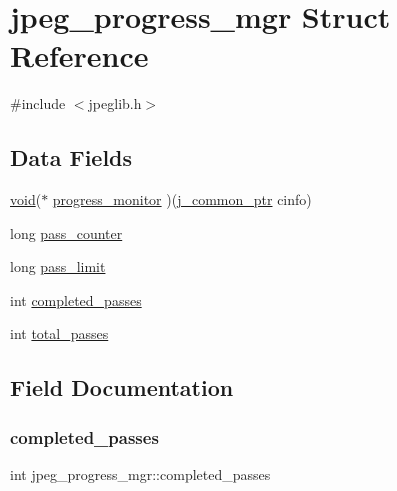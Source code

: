\hypertarget{structjpeg__progress__mgr}{}\section{jpeg\+\_\+progress\+\_\+mgr Struct Reference}
\label{structjpeg__progress__mgr}


{\ttfamily \#include $<$jpeglib.\+h$>$}

\subsection*{Data Fields}
\begin{DoxyCompactItemize}
\item 
\hyperlink{png_8h_ac9c84fa68bbad002983e35ce3663c686}{void}($\ast$ \hyperlink{structjpeg__progress__mgr_a40a343e73052f85b9b5984916276ea6b}{progress\+\_\+monitor} )(\hyperlink{jpeglib_8h_a1a177ab705cefea8f30ec31a48e62650}{j\+\_\+common\+\_\+ptr} cinfo)
\item 
long \hyperlink{structjpeg__progress__mgr_ae52d1c89154d3f15ea44f96ee1c4ea7f}{pass\+\_\+counter}
\item 
long \hyperlink{structjpeg__progress__mgr_a68ec6ba74838f7b2b8ded8d4c8254c1d}{pass\+\_\+limit}
\item 
int \hyperlink{structjpeg__progress__mgr_a0cf4c1c84b2662763053e0eeaca417f3}{completed\+\_\+passes}
\item 
int \hyperlink{structjpeg__progress__mgr_a35d61747861f284526a9b312b3dc59ca}{total\+\_\+passes}
\end{DoxyCompactItemize}


\subsection{Field Documentation}
\mbox{\label{structjpeg__progress__mgr_a0cf4c1c84b2662763053e0eeaca417f3}} 
\subsubsection{\texorpdfstring{completed\+\_\+passes}{completed\_passes}}
{\footnotesize\ttfamily int jpeg\+\_\+progress\+\_\+mgr\+::completed\+\_\+passes}

